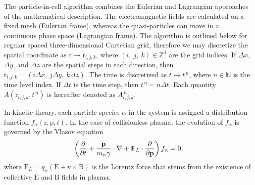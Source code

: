 \documentclass[10pt, a4paper, twoside, openright]{report}
\renewcommand{\vec}[1]{\boldsymbol{\mathrm{#1}}}
\begin{document}
The particle-in-cell algorithm combines the Eulerian and Lagrangian approaches of the mathematical description. The electromagnetic fields are calculated on a fixed mesh (Eulerian frame), whereas the quasi-particles can move in a continuous phase space (Lagrangian frame). The algorithm is outlined below for regular spaced three-dimensional Cartesian grid, therefore we may discretize the spatial coordinate as $ \vec{r} \rightarrow \vec{r}_{i, j, k} $, where $ (i, \ j, \ k) \in \mathbb{Z}^{3} $ are the grid indices. If $ \Delta x $, $ \Delta y $, and $ \Delta z $ are the spatial steps in each direction, then $ \vec{r}_{i, j, k} = \left( i \Delta x, \ j \Delta y, \ k \Delta z \right) $. The time is discretized as $ t \rightarrow t^{\,n} $, where $ n \in \mathbb{N} $ is the time level index. If $ \Delta t $ is the time step, then $ t^{\,n} = n \Delta t $. Each quantity $ A \left(\vec{r}_{i, j, k}, t^{\,n} \right) $ is hereafter denoted as $ A_{i, j, k}^{\,n} $.


In kinetic theory, each particle species $ \alpha $ in the system is assigned a distribution function $ f_{\alpha} \left( \vec{r}, \vec{p}, t \right) $. In the case of collisionless plasma, the evolution of $ f_{\alpha} $ is governed by the Vlasov equation
\begin{equation}\label{eq:vlasov_eq}
	\left( \diffp[]{}{t} + \frac{\vec{p}}{m_{\alpha} \gamma} \cdot \nabla + \vec{F}_L \cdot \frac{\partial}{\partial \vec{p}} \right) f_{\alpha} = 0,
\end{equation}
where $ \vec{F}_L = q_{\alpha} \left( \vec{E} + \vec{v} \times \vec{B} \right) $ is the Lorentz force that stems from the existence of collective $ \vec{E} $ and $ \vec{B} $ fields in plasma.
\end{document}
